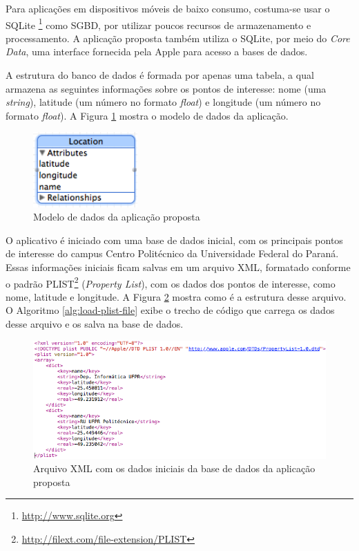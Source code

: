 Para aplicações em dispositivos móveis de baixo consumo, costuma-se usar o SQLite
\footnote{\href{http://www.sqlite.org}{http://www.sqlite.org}} como \gls{SGBD}, 
por utilizar poucos recursos de armazenamento e processamento. A aplicação proposta
também utiliza o SQLite, por meio do \textit{Core Data}, uma interface fornecida 
pela Apple para acesso a bases de dados.

A estrutura do banco de dados é formada por apenas uma tabela, a qual armazena as
seguintes informações sobre os pontos de interesse: nome (uma \textit{string}), 
latitude (um número no formato \textit{float}) e longitude (um número no 
formato \textit{float}). A Figura \ref{fig:modelo_dados} mostra o modelo de dados 
da aplicação.


\begin{figure}[h!]
    \centering
    \caption{Modelo de dados da aplicação proposta}
    \label{fig:modelo_dados}
    \includegraphics[width=4cm]{resources/App_Source_Code/db-scheme.png}
\end{figure}



O aplicativo é iniciado com uma base de dados inicial, com os principais pontos de interesse do campus Centro Politécnico
da Universidade Federal do Paraná. Essas informações iniciais ficam salvas em um arquivo \gls{XML}, formatado conforme
o padrão PLIST\footnote{\href{http://filext.com/file-extension/PLIST}{http://filext.com/file-extension/PLIST}} 
(\textit{Property List}), com os dados dos pontos de interesse, como nome, latitude e longitude. A Figura 
\ref{fig:plist-file} mostra como é a estrutura desse arquivo. O Algoritmo \ref{alg:load-plist-file} exibe o
trecho de código que carrega os dados desse arquivo e os salva na base de dados.


\begin{figure}[h!]
    \centering
    \caption{Arquivo XML com os dados iniciais da base de dados da aplicação proposta}
    \label{fig:plist-file}
    \includegraphics[width=17cm]{resources/App_Source_Code/plist-file.png}
\end{figure}



